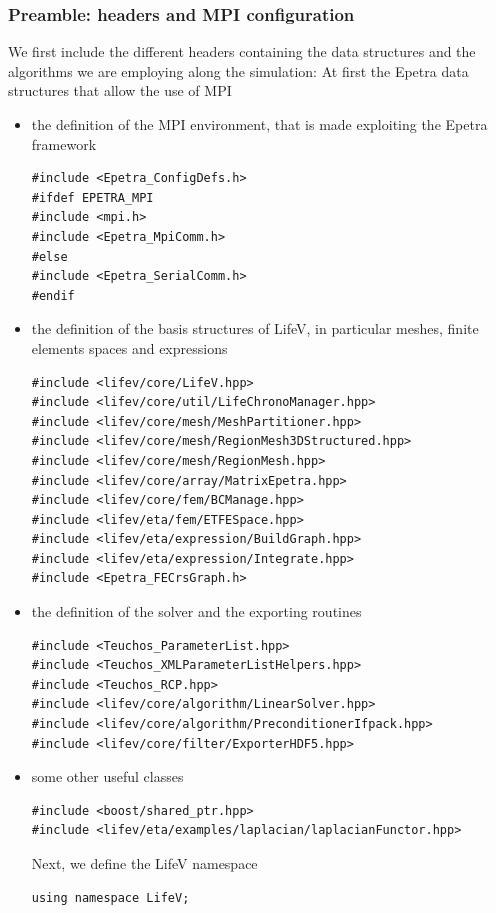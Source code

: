 \subsubsection*{Preamble: headers and MPI configuration}
We first include the different headers containing the data structures and the algorithms we are employing along the simulation: At first the Epetra data structures that allow the use of MPI
\begin{itemize}
\item the definition of the MPI environment, that is made exploiting the Epetra framework
\begin{lstlisting}
#include <Epetra_ConfigDefs.h>
#ifdef EPETRA_MPI
#include <mpi.h>
#include <Epetra_MpiComm.h>
#else
#include <Epetra_SerialComm.h>
#endif
\end{lstlisting}
\item the definition of the basis structures of LifeV, in particular meshes, finite elements spaces and expressions
\begin{lstlisting}
#include <lifev/core/LifeV.hpp>
#include <lifev/core/util/LifeChronoManager.hpp>
#include <lifev/core/mesh/MeshPartitioner.hpp>
#include <lifev/core/mesh/RegionMesh3DStructured.hpp>
#include <lifev/core/mesh/RegionMesh.hpp>
#include <lifev/core/array/MatrixEpetra.hpp>
#include <lifev/core/fem/BCManage.hpp>
#include <lifev/eta/fem/ETFESpace.hpp>
#include <lifev/eta/expression/BuildGraph.hpp>
#include <lifev/eta/expression/Integrate.hpp>
#include <Epetra_FECrsGraph.h>
\end{lstlisting}
\item the definition of the solver and the exporting routines
\begin{lstlisting}
#include <Teuchos_ParameterList.hpp>
#include <Teuchos_XMLParameterListHelpers.hpp>
#include <Teuchos_RCP.hpp>
#include <lifev/core/algorithm/LinearSolver.hpp>
#include <lifev/core/algorithm/PreconditionerIfpack.hpp>
#include <lifev/core/filter/ExporterHDF5.hpp>
\end{lstlisting}
\item some other useful classes
\begin{lstlisting}
#include <boost/shared_ptr.hpp>
#include <lifev/eta/examples/laplacian/laplacianFunctor.hpp>
\end{lstlisting}
Next, we define the LifeV namespace

\begin{lstlisting}
using namespace LifeV;


\end{lstlisting}


\end{itemize}
